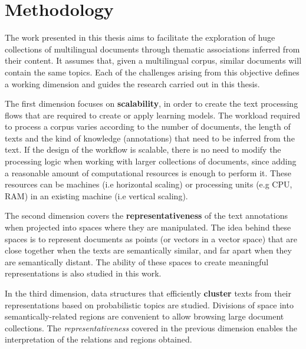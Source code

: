 

\chapter{Methodology}\label{ch:hypothesis}

\graphicspath{{hypothesis/figures/}}


The work presented in this thesis aims to facilitate the exploration of huge collections of multilingual documents through thematic associations inferred from their content. It assumes that, given a multilingual corpus, similar documents will contain the same topics. Each of the challenges arising from this objective defines a working dimension and guides the research carried out in this thesis.

The first dimension focuses on \textbf{scalability}, in order to create the text processing flows that are required to create or apply learning models. The workload required to process a corpus varies according to the number of documents, the length of texts and the kind of knowledge (annotations) that need to be inferred from the text. If the design of the workflow is scalable, there is no need to modify the processing logic when working with larger collections of documents, since adding a reasonable amount of computational resources is enough to perform it. These resources can be machines (i.e horizontal scaling) or processing units (e.g CPU, RAM) in an existing machine (i.e vertical scaling). 

The second dimension covers the \textbf{representativeness} of the text annotations when projected into spaces where they are manipulated. The idea behind these spaces is to represent documents as points (or vectors in a vector space) that are close together when the texts are semantically similar, and far apart when they are semantically distant. The ability of these spaces to create meaningful representations is also studied in this work.

In the third dimension, data structures that efficiently \textbf{cluster} texts from their representations based on probabilistic topics are studied. Divisions of space into semantically-related regions are convenient to allow browsing large document collections. The \textit{representativeness} covered in the previous dimension enables the interpretation of the relations and regions obtained.

